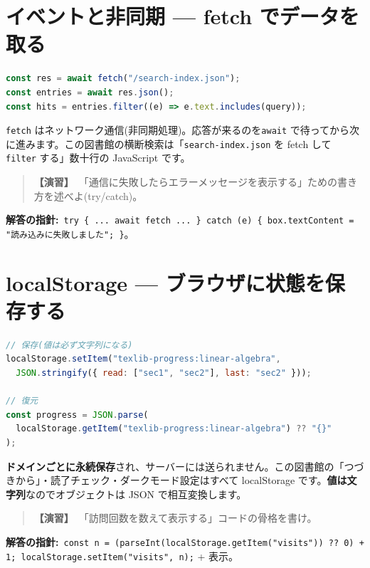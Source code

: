 \documentclass{article}
\begin{document}
\section{イベントと非同期 — fetch でデータを取る}

\begin{lstlisting}[language=JavaScript]
const res = await fetch("/search-index.json");
const entries = await res.json();
const hits = entries.filter((e) => e.text.includes(query));
\end{lstlisting}

\texttt{fetch} はネットワーク通信(非同期処理)。応答が来るのを\texttt{await} で待ってから次に進みます。この図書館の横断検索は「\texttt{search-index.json} を fetch して \texttt{filter} する」数十行の JavaScript です。

\begin{quote}
\textbf{【演習】}\ 「通信に失敗したらエラーメッセージを表示する」ための書き方を述べよ(try/catch)。
\end{quote}

\textbf{解答の指針:}\ \texttt{try \{ ... await fetch ... \} catch (e) \{ box.textContent = "読み込みに失敗しました"; \}}。

\section{localStorage — ブラウザに状態を保存する}

\begin{lstlisting}[language=JavaScript]
// 保存(値は必ず文字列になる)
localStorage.setItem("texlib-progress:linear-algebra",
  JSON.stringify({ read: ["sec1", "sec2"], last: "sec2" }));

// 復元
const progress = JSON.parse(
  localStorage.getItem("texlib-progress:linear-algebra") ?? "{}"
);
\end{lstlisting}

\textbf{ドメインごとに永続保存}され、サーバーには送られません。この図書館の「つづきから」・読了チェック・ダークモード設定はすべて localStorage です。\textbf{値は文字列}なのでオブジェクトは JSON で相互変換します。

\begin{quote}
\textbf{【演習】}\ 「訪問回数を数えて表示する」コードの骨格を書け。
\end{quote}

\textbf{解答の指針:}\ \texttt{const n = (parseInt(localStorage.getItem("visits")) ?? 0) + 1; localStorage.setItem("visits", n);} + 表示。
\end{document}
